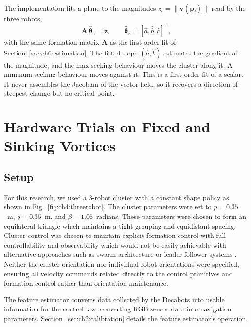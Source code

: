 The implementation fits a plane to the magnitudes $z_i =
\lVert\mathbf{v}(\mathbf{p}_i)\rVert$ read by the three robots,
\begin{equation}
    \mathbf{A}\,\hat{\boldsymbol{\theta}}_z = \mathbf{z}, \qquad
    \hat{\boldsymbol{\theta}}_z = [\hat{a}, \hat{b}, \hat{c}]^{\top},
    \label{eq:ch5:mag_fit}
\end{equation}
with the same formation matrix $\mathbf{A}$ as the first-order fit of
Section~\ref{sec:ch6:estimation}. The fitted slope
$(\hat{a}, \hat{b})$ estimates the gradient of the magnitude, and the
max-seeking behaviour moves the cluster along it. A minimum-seeking
behaviour moves against it. This is a first-order fit of a scalar. It
never assembles the Jacobian of the vector field, so it recovers a
direction of steepest change but no critical point.

\section{Hardware Trials on Fixed and Sinking Vortices}
\label{sec:ch5:trials}

\subsection{Setup}

For this research, we used a 3-robot cluster with a constant shape policy
as shown in Fig.~\ref{fig:ch4:threerobot}. The cluster parameters were set
to $p = 0.35$~m, $q = 0.35$~m, and $\beta = 1.05$~radians. These
parameters were chosen to form an equilateral triangle which maintains a
tight grouping and equidistant spacing. Cluster control was chosen to
maintain explicit formation control with full controllability and
observability which would not be easily achievable with alternative
approaches such as swarm architecture or leader-follower systems
\cite{44}. Neither the cluster orientation nor individual robot
orientations were specified, ensuring all velocity commands related
directly to the control primitives and formation control rather than
orientation maintenance.

The feature estimator converts data collected by the Decabots into usable
information for the control law, converting RGB sensor data into
navigation parameters. Section~\ref{sec:ch2:calibration} details the
feature estimator's operation.

